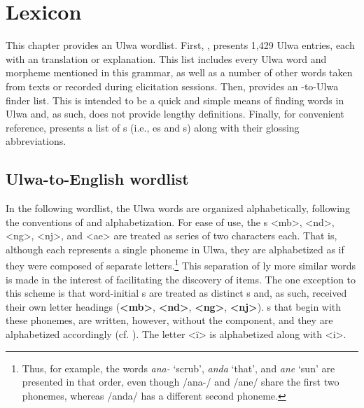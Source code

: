 \chapter{Lexicon}\label{sec:17}


This chapter provides an Ulwa wordlist. First, , presents 1,429 Ulwa  entries, each with an  translation or explanation. This list includes every Ulwa word and morpheme mentioned in this grammar, as well as a number of other words taken from texts or recorded during elicitation sessions. Then,  provides an -to-Ulwa finder list. This is intended to be a quick and simple means of finding words in Ulwa and, as such, does not provide lengthy definitions. Finally, for convenient reference,  presents a list of s (i.e., es and s) along with their glossing abbreviations.


\section{Ulwa-to-English wordlist}\label{sec:17.1}


In the following wordlist, the Ulwa words are organized alphabetically, following the conventions of  and  alphabetization. For ease of use, the s <mb>, <nd>, <ng>, <nj>, and <ae> are treated as series of two characters each. That is, although each  represents a single phoneme in Ulwa, they are alphabetized as if they were composed of separate letters.\footnote{Thus, for example, the words \textit{ana-} ‘scrub’, \textit{anda} ‘that’, and \textit{ane} ‘sun’ are presented in that order, even though /ana-/ and /ane/ share the first two phonemes, whereas /anda/ has a different second phoneme.} This separation of ly more similar words is made in the interest of facilitating the discovery of  items. The one exception to this scheme is that word-initial   s are treated as distinct s and, as such, received their own letter headings (\textbf{<mb>}, \textbf{<nd>}, \textbf{<ng>}, \textbf{<nj>}). s that begin with these phonemes, are written, however, without the  component, and they are alphabetized accordingly (cf. ). The letter <ï> is alphabetized along with <i>.

